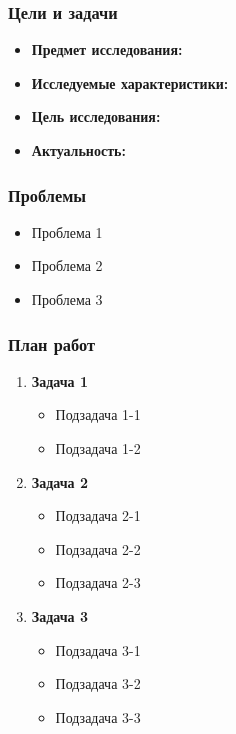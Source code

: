 \documentclass[14pt]{beamer}
\title{\small{\thesisTitle}}
\author{\small{%
\emph{Выступающий:}~\thesisAuthorShort\\%
\emph{Руководитель:}~\supervisorRegaliaShort~\supervisorFioShort}\\%
\vspace{30pt}%
\thesisOrganization%
\vspace{20pt}%
}
\date{\small{\thesisCity, \thesisYear}}
\begin{document}
\maketitle

\begin{frame}
\frametitle{Цели и задачи}
\begin{itemize}
  \item \textbf{Предмет исследования:} 
  \item \textbf{Исследуемые характеристики:} 
  \item \textbf{Цель исследования:} 
  \item \textbf{Актуальность:} 
\end{itemize}
\end{frame}

\begin{frame}
\frametitle{Проблемы}
\begin{itemize}
  \item Проблема 1
  \item Проблема 2
  \item Проблема 3    
\end{itemize}
\end{frame}

\begin{frame}
\frametitle{План работ}
\begin{enumerate}
  \item \textbf{Задача 1}
  \begin{itemize}
    \item Подзадача 1-1
    \item Подзадача 1-2
  \end{itemize}
  \item \textbf{Задача 2}
  \begin{itemize}
    \item Подзадача 2-1
    \item Подзадача 2-2
    \item Подзадача 2-3
  \end{itemize}
  \item \textbf{Задача 3}
  \begin{itemize}
    \item Подзадача 3-1
    \item Подзадача 3-2
    \item Подзадача 3-3
  \end{itemize}
\end{enumerate}
\end{frame}
\end{document}
